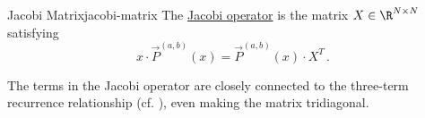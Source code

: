 \begin{remark}{Jacobi Matrix}{jacobi-matrix}
  The \href{https://en.wikipedia.org/wiki/Jacobi_operator}{Jacobi operator} is the matrix \(X \in \R^{N \times N}\) satisfying
  $$x \cdot \vec{P}^{(a,b)}(x) = \vec{P}^{(a,b)}(x) \cdot X^T\,.$$
\end{remark}

The terms in the Jacobi operator are closely connected to the three-term recurrence relationship (cf. ), even making the matrix tridiagonal.
